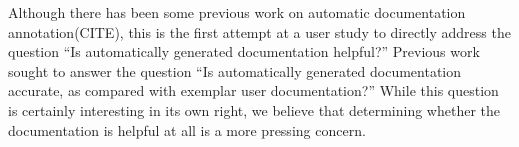 Although there has been some previous work on automatic
documentation annotation(CITE), this is the first attempt at a user study
to directly address the question
``Is automatically generated documentation helpful?''
Previous work sought to answer the question
``Is automatically generated documentation accurate,
as compared with exemplar user documentation?''
While this question is certainly interesting in its own right,
we believe that determining whether the documentation is helpful
at all is a more pressing concern.


